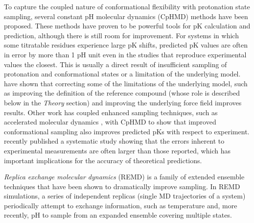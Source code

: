 To capture the coupled nature of conformational flexibility with protonation
state sampling, several constant pH molecular dynamics (CpHMD) methods have been
proposed. \cite{Baptista_Proteins_1997_v27_p523,
Baptista_JChemPhys_2002_v117_p4184, Burgi_Proteins_2002_v47_p469,
Lee_Proteins_2004_v56_p738, Borjesson_JPhysChemB_2004_v108_p13551,
Mongan_JComputChem_2004_v25_p2038, Khandogin_BiophysJ_2005_v89_p141} These
methods have proven to be powerful tools for pK calculation and
prediction, although there is still room for improvement.
\cite{Alexov_Proteins_2011_v79_p3260} For systems in which some titratable
residues experience large pK shifts, predicted pK values are often
in error by more than 1 pH unit even in the studies that reproduce experimental
values the closest. \cite{Alexov_Proteins_2011_v79_p3260} This is usually a
direct result of insufficient sampling of protonation and conformational states
or a limitation of the underlying model.
\citeauthor{Machuqueiro_Proteins_2011_v79_p3437} have shown that correcting some
of the limitations of the underlying model, such as improving the definition of
the reference compound (whose role is described below in the \emph{Theory}
section) and improving the underlying force field improves results.
\cite{Machuqueiro_Proteins_2011_v79_p3437} Other work has coupled enhanced
sampling techniques, such as accelerated molecular dynamics
\cite{Hamelberg_JChemPhys_2004_v120_p11919}, with CpHMD to show that improved
conformational sampling also improves predicted pKs with respect to
experiment.  \cite{Williams_JChemTheoryComput_2010_v6_p560}
\citeauthor{Webb_Proteins_2011_v79_p685} recently published a systematic study
showing that the errors inherent to experimental measurements are often larger
than those reported, which has important implications for the accuracy of
theoretical predictions. \cite{Webb_Proteins_2011_v79_p685}

\emph{Replica exchange molecular dynamics} (REMD) is a family of extended
ensemble techniques that have been shown to dramatically improve sampling.
\cite{Sugita_ChemPhysLett_1999_v314_p141,
Pitera_ProcNatlAcadSci_2003_v100_p7587, Chodera_JChemPhys_2011_v135_p194110,
Nadler2008, Meng_JChemTheoryComput_2010_v6_p1401,
Meng_JChemTheoryComput_2011_v7_p2721} In REMD simulations, a series of
independent replicas (single MD trajectories of a system) periodically attempt
to exchange information, such as temperature
\cite{Sugita_ChemPhysLett_1999_v314_p141,
Pitera_ProcNatlAcadSci_2003_v100_p7587} and, more recently, pH
\cite{Itoh_Proteins_2011_v79_p3420, Wallace_JChemTheoryComput_2011_v7_p2617} to
sample from an expanded ensemble covering multiple states.

